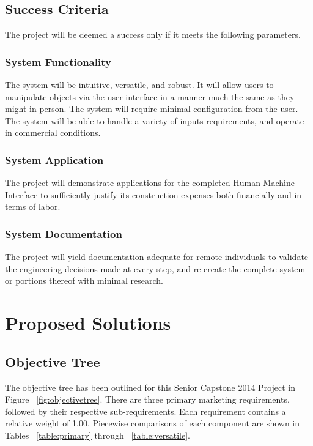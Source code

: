 \documentclass[11pt]{report}
\begin{document}
\section{Success Criteria}
The project will be deemed a success only if it meets the following parameters.

\subsection{System Functionality}
The system will be intuitive, versatile, and robust.
It will allow users to manipulate objects via the user interface in a manner much the same as they might in person.
The system will require minimal configuration from the user.
The system will be able to handle a variety of inputs requirements, and operate in commercial conditions.

\subsection{System Application}
The project will demonstrate applications for the completed Human-Machine Interface to sufficiently justify its construction expenses both financially and in terms of labor.

\subsection{System Documentation}
The project will yield documentation adequate for remote individuals to validate the engineering decisions made at every step, and re-create the complete system or portions thereof with minimal research.

\chapter{Proposed Solutions}
\section{Objective Tree}
The objective tree has been outlined for this Senior Capstone 2014 Project in Figure ~\ref{fig:objectivetree}.
There are three primary marketing requirements, followed by their respective sub-requirements. Each requirement contains a relative weight of 1.00.
Piecewise comparisons of each component are shown in Tables ~\ref{table:primary} through ~\ref{table:versatile}.
\end{document}
